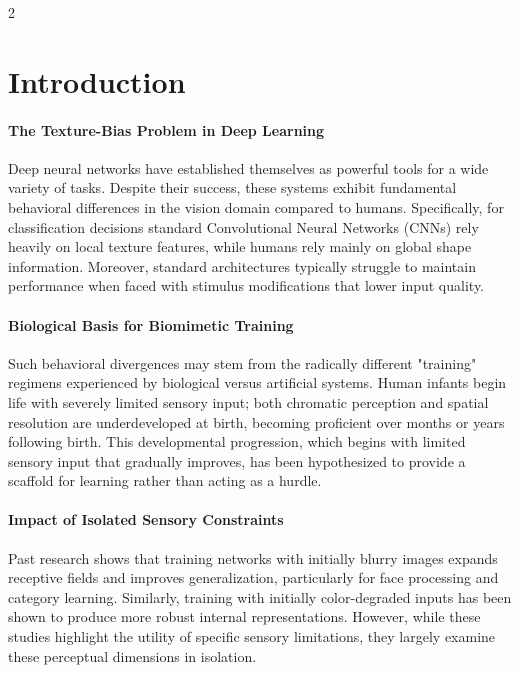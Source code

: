 \begin{multicols}{2}
\tableofcontents
\section{Introduction}

\paragraph{The Texture-Bias Problem in Deep Learning}
Deep neural networks have established themselves as powerful tools for a wide variety of tasks. Despite their success, these systems exhibit fundamental behavioral differences in the vision domain compared to humans. Specifically, for classification decisions standard Convolutional Neural Networks (CNNs) rely heavily on local texture features, while humans rely mainly on global shape information.\cite{geirhos2018a} Moreover, standard architectures typically struggle to maintain performance when faced with stimulus modifications that lower input quality.\cite{geirhos2018b}

\paragraph{Biological Basis for Biomimetic Training}
Such behavioral divergences may stem from the radically different "training" regimens experienced by biological versus artificial systems. Human infants begin life with severely limited sensory input; both chromatic perception and spatial resolution are underdeveloped at birth, becoming proficient over months or years following birth.\cite{dobsonandteller1978, adamsandcourage2002} This developmental progression, which begins with limited sensory input that gradually improves, has been hypothesized to provide a scaffold for learning rather than acting as a hurdle.\cite{turkewitzandkenny1982, newport1988, elman1993}

\paragraph{Impact of Isolated Sensory Constraints}
Past research shows that training networks with initially blurry images expands receptive fields and improves generalization,\cite{vogelsang2018} particularly for face processing\cite{jang2021convolutional} and category learning.\cite{jinsi2023early} Similarly, training with initially color-degraded inputs has been shown to produce more robust internal representations.\cite{vogelsang2024b} However, while these studies highlight the utility of specific sensory limitations, they largely examine these perceptual dimensions in isolation.


\end{multicols}

